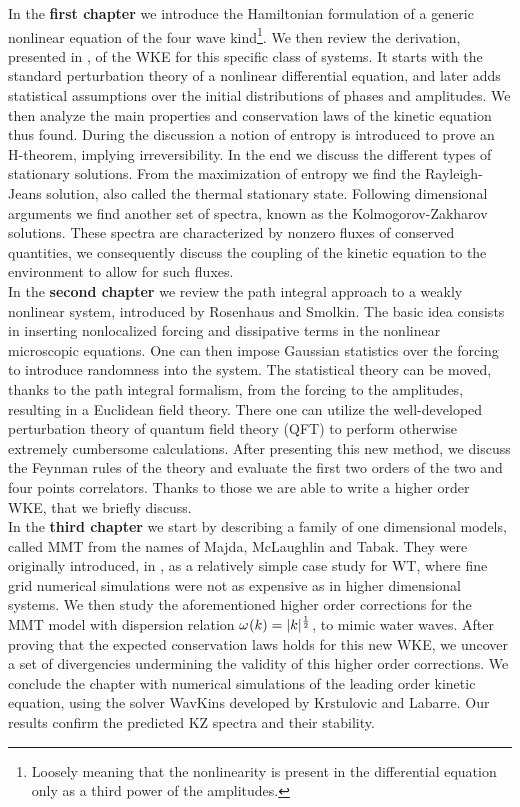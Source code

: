     In the \textbf{first chapter} we introduce the Hamiltonian formulation of a generic nonlinear equation of the four wave kind\footnote{Loosely meaning that the nonlinearity is present in the differential equation only as a third power of the amplitudes.}. We then review the derivation, presented in \cite{Onorato2020}, of the WKE for this specific class of systems. It starts with the standard perturbation theory of a nonlinear differential equation, and later adds statistical assumptions over the initial distributions of phases and amplitudes. We then analyze the main properties and conservation laws of the kinetic equation thus found. During the discussion a notion of entropy is introduced to prove an H-theorem, implying irreversibility. In the end we discuss the different types of stationary solutions. From the maximization of entropy we find the Rayleigh-Jeans solution, also called the thermal stationary state. Following dimensional arguments we find another set of spectra, known as the Kolmogorov-Zakharov solutions. These spectra are characterized by nonzero fluxes of conserved quantities, we consequently discuss the coupling of the kinetic equation to the environment to allow for such fluxes.\\
    In the \textbf{second chapter} we review the path integral approach to a weakly nonlinear system, introduced by Rosenhaus and Smolkin. The basic idea consists in inserting nonlocalized forcing and dissipative terms in the nonlinear microscopic equations. One can then impose Gaussian statistics over the forcing to introduce randomness into the system. The statistical theory can be moved, thanks to the path integral formalism, from the forcing to the amplitudes, resulting in a Euclidean field theory. There one can utilize the well-developed perturbation theory of quantum field theory (QFT) to perform otherwise extremely cumbersome calculations. After presenting this new method, we discuss the Feynman rules of the theory and evaluate the first two orders of the two and four points correlators. Thanks to those we are able to write a higher order WKE, that we briefly discuss.\\
    In the \textbf{third chapter} we start by describing a family of one dimensional models, called MMT from the names of Majda, McLaughlin and Tabak. They were originally introduced, in \cite{Majda1997}, as a relatively simple case study for WT, where fine grid numerical simulations were not as expensive as in higher dimensional systems. We then study the aforementioned higher order corrections for the MMT model with dispersion relation $\omega^{} (k) = |k|^\frac{1}{2}$, to mimic water waves. After proving that the expected conservation laws holds for this new WKE, we uncover a set of divergencies undermining the validity of this higher order corrections. We conclude the chapter with numerical simulations of the leading order kinetic equation, using the solver WavKins developed by Krstulovic and Labarre. Our results confirm the predicted  KZ spectra and their stability. 



    

